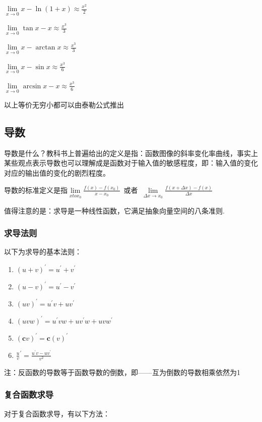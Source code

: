 \documentclass[UTF8]{ctexbook}
\newcommand{\limNormal}[1]{\lim\limits_{#1}}
\newcommand{\myLimToZero}{\limNormal{x \to 0}}
\newcommand{\derivative}{^\prime}
\begin{document}
{{{{    $\myLimToZero x - \ln(1 + x) \approx \frac{x^2}{2}$

    $\myLimToZero \tan x - x \approx \frac{x^3}{3}$

    $\myLimToZero x - \arctan x \approx \frac{x^3}{3}$

    $\myLimToZero x - \sin x \approx \frac{x^3}{6}$

    $\myLimToZero \arcsin x - x \approx \frac{x^3}{6}$

    以上等价无穷小都可以由泰勒公式推出
  }%

}%

\subsection{导数}{
  导数是什么？教科书上普遍给出的定义是指：函数图像的斜率变化率曲线，事实上某些观点表示导数也可以理解成是函数对于输入值的敏感程度，即：输入值的变化对应的输出值的变化的剧烈程度。

  导数的标准定义是指$\limNormal{x to x_0}\frac{f(x) - f(x_0)}{x - x_0}$\ 或者\ $\limNormal{\Delta x \to x_0}\frac{f(x + \Delta x) - f(x)}{\Delta x}$

  值得注意的是：求导是一种线性函数，它满足抽象向量空间的八条准则.

  \subsubsection{求导法则}{
    以下为求导的基本法则：
    \begin{enumerate}
      \item $(u + v)\derivative = u\derivative + v\derivative$
      \item $(u - v)\derivative = u\derivative - v\derivative$
      \item $(uv)\derivative = u\derivative v + uv\derivative$
      \item $(uvw)\derivative = u\derivative vw + uv\derivative w + uvw\derivative$
      \item $(\mathbf{c}v)\derivative = \mathbf{c}(v)\derivative$
      \item $\frac{u}{v}\derivative = \frac{u\derivative v - uv\derivative}{v^2}$
    \end{enumerate}
    注：反函数的导数等于函数导数的倒数，即——互为倒数的导数相乘依然为1
  }%

  \subsubsection{复合函数求导}{
    对于复合函数求导，有以下方法：

}}}}
\end{document}
